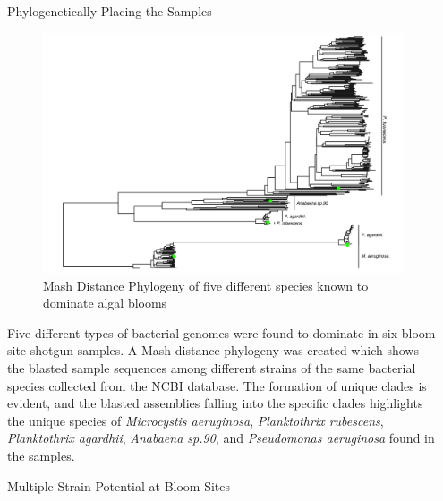 \documentclass[final]{beamer}
\newlength{\sepwidth}
\newlength{\colwidth}
\newcommand{\separatorcolumn}{\begin{column}{\sepwidth}\end{column}}
\begin{document}
\begin{frame}[t]
\begin{columns}[t]
\separatorcolumn

\begin{column}{\colwidth}

   \begin{block}{Phylogenetically Placing the Samples}
    
    \begin{figure}
    \includegraphics[width=\textwidth]{mashphylogeny.png}
     \caption{Mash Distance Phylogeny of five different species known to dominate algal blooms }
     \end{figure}
     
     Five different types of bacterial genomes were found to dominate in six bloom site shotgun samples. A Mash distance phylogeny was created
     which shows the blasted sample sequences among different strains of the same bacterial species collected from the NCBI database.
     The formation of unique clades is evident, and the blasted assemblies falling into the specific clades highlights the 
     unique species of \emph{Microcystis aeruginosa}, \emph{Planktothrix rubescens}, \emph{Planktothrix agardhii}, \emph{Anabaena sp.90}, and
     \emph{Pseudomonas aeruginosa} found in the samples.

  \end{block}

  \begin{block}{Multiple Strain Potential at Bloom Sites}
    

\end{block}
\end{column}
\end{columns}
\end{frame}
\end{document}
